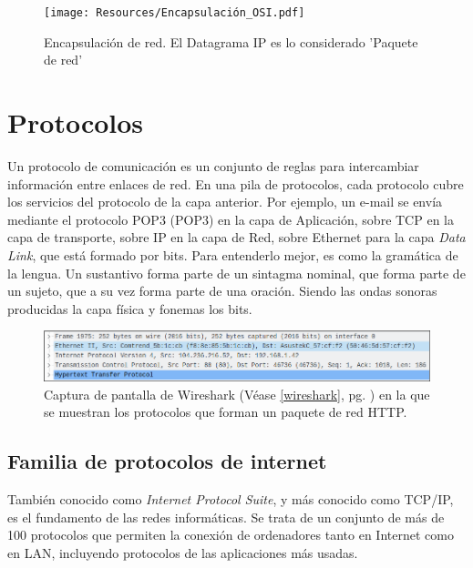 \documentclass[a4paper, 11pt]{report} %
\newcommand{\acr}[1]{\acrshort{#1} (\acrlong{#1})}
\begin{document}
\vspace{1cm}
\begin{figure}[H]
\noindent
\centering
\texttt{[image: Resources/Encapsulación\_OSI.pdf]}
\caption{Encapsulación de red. El Datagrama IP es lo considerado 'Paquete de red'}
\end{figure}
\vspace{\fill}
\newpage

\section{Protocolos}
Un protocolo de comunicación es un conjunto de reglas para intercambiar información entre enlaces de red. En una pila de protocolos, cada protocolo cubre los servicios del protocolo de la capa anterior. Por ejemplo, un e-mail se envía mediante el protocolo \acr{POP3} en la capa de Aplicación, sobre TCP en la capa de transporte, sobre IP en la capa de Red, sobre Ethernet para la capa \textit{Data Link}, que está formado por bits. Para entenderlo mejor, es como la gramática de la lengua. Un sustantivo forma parte de un sintagma nominal, que forma parte de un sujeto, que a su vez forma parte de una oración. Siendo las ondas sonoras producidas la capa física y fonemas los bits.
\begin{figure}[H]
\noindent
\includegraphics[width=\textwidth]{Resources/Wireshark01.png}
\caption[Captura de pantalla de Wireshark]{Captura de pantalla de Wireshark (Véase \ref{wireshark}, pg. \pageref{wireshark}) en la que se muestran los protocolos que forman un paquete de red HTTP.}
\end{figure}

\subsection{Familia de protocolos de internet}
También conocido como \textit{Internet Protocol Suite}, y más conocido como TCP/IP, es el fundamento de las redes informáticas. Se trata de un conjunto de más de 100 protocolos que permiten la conexión de ordenadores tanto en Internet como en LAN, incluyendo protocolos de las aplicaciones más usadas.

\setcounter{secnumdepth}{5}
\end{document}
